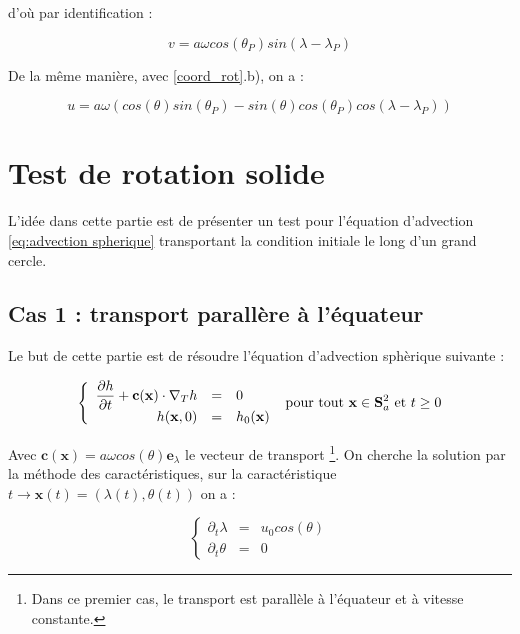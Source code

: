 d'où par identification :

\begin{equation}
\label{vitesse_solide_v}
v = a \omega cos ( \theta_P ) sin( \lambda - \lambda_P )
\end{equation}

De la même manière, avec \ref{coord_rot}.b), on a :

\begin{equation}
\label{vitesse_solide_u}
u = a  \omega \left( cos ( \theta ) sin( \theta_P) - sin( \theta ) cos( \theta_P) cos( \lambda - \lambda_P) \right)
\end{equation}

\section{Test de rotation solide}

L'idée dans cette partie est de présenter un test pour l'équation d'advection \eqref{eq:advection spherique} transportant la condition initiale le long d'un grand cercle.

\subsection{Cas 1 : transport parallère à l'équateur}

Le but de cette partie est de résoudre l'équation d'advection sphèrique suivante :

\begin{equation}
\label{eq:advection spherique 1}
\left\lbrace
\begin{array}{r cl}
\dfrac{\partial h}{\partial t} + \mathbf{c} ( \mathbf{x} ) \cdot \nabla_ T h & = & 0 \\
h(\mathbf{x},0) & = & h_0 ( \mathbf{x} )
\end{array}
\right. \text{ pour tout } \mathbf{x} \in \mathbf{S}_a^2 \text{ et } t \geq 0
\end{equation}

Avec $\mathbf{c} ( \mathbf{x} ) = a \omega cos ( \theta ) \mathbf{e}_{\lambda}$ le vecteur de transport \footnote{Dans ce premier cas, le transport est parallèle à l'équateur et à vitesse constante.}.
On cherche la solution par la méthode des caractéristiques, sur la caractéristique $t \rightarrow\mathbf{x}(t) = (\lambda (t), \theta(t) )$ on a :

\begin{equation}
\left\lbrace
\begin{array}{rcl}
\partial_t \lambda & = & u_0 cos ( \theta ) \\
\partial_t \theta & = & 0
\end{array}
\right.
\end{equation}

